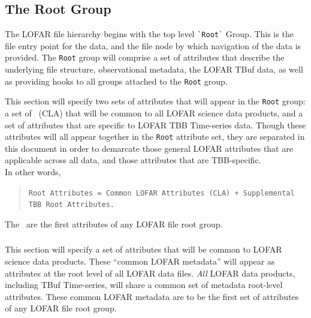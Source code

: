 \documentclass[a4paper,10pt,bibtotoc]{scrartcl}
\begin{document}

\subsection{The Root Group}
\label{sec:root group}

The LOFAR file hierarchy begins with the top level \verb|`Root`| Group.  This is
the file entry point for the data, and the file node by which navigation of
the data is provided. The \texttt{Root} group will comprise a set of attributes
that describe the underlying file structure, observational metadata, the LOFAR
TBuf data, as well as providing hooks to all groups attached to the \texttt{Root} group.

This section will specify two sets of attributes that will appear in
the \texttt{Root} group: a set of \cla\ (CLA) that will be common to
all LOFAR science data products, and a set of attributes that are
specific to LOFAR TBB Time-series data.  Though these attributes will
all appear together in the \texttt{Root} attribute set, they are
separated in this document in order to demarcate those general LOFAR
attributes that are applicable across all data, and those attributes
that are TBB-specific.\\
In other words,

\begin{verse}
\verb|Root Attributes = Common LOFAR Attributes (CLA) + Supplemental TBB Root Attributes.|
\end{verse}

The \cla\ are the first attributes of any LOFAR file root group.

\subsubsection{\cla}
\label{sec:common lofar attributes}

This section will specify a set of attributes that will be common to
LOFAR science data products.  These ``common LOFAR metadata'' will
appear as attributes at the root level of all LOFAR data files.
\textit{All} LOFAR data products, including TBuf Time-series,
will share a common set of metadata root-level
attributes.  These common LOFAR metadata are to be the first set of
attributes of any LOFAR file root group.
\end{document}
